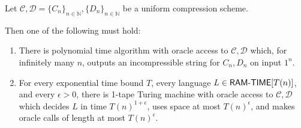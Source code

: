 \begin{theorem}\label{lossy:thm:low-space-sim}
Let $\mathcal{C},\mathcal{D} = \{C_n\}_{n \in \mathbb{N}}, \{D_n\}_{n \in \mathbb{N}}$ be a uniform compression scheme.

Then one of the following must hold:
\begin{enumerate}
    \item There is polynomial time algorithm with oracle access to $\mathcal{C},\mathcal{D}$ which, for infinitely many $n$, outputs an incompressible string for $C_n,D_n$ on input $1^n$.
    \item For every exponential time bound $T$, every language $L \in \cl{RAM\dash TIME}[T(n)]$, and every $\epsilon > 0$, there is 1-tape Turing machine with oracle access to $\mathcal{C},\mathcal{D}$ which decides $L$ in time $T(n)^{1+\epsilon}$, uses space at most $T(n)^{\epsilon}$, and makes oracle calls of length at most $T(n)^{\epsilon}$.
\end{enumerate}
\end{theorem}

